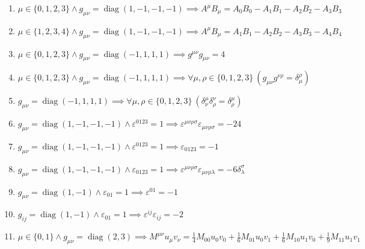 \documentclass[11pt,a4paper]{article}
\begin{document}
\begin{enumerate}
\item $\displaystyle \mu \in \{0, 1, 2, 3\} \land g_{\mu\nu} = \operatorname{diag}(1, -1, -1, -1) \implies A^{\mu} B_{\mu} = A_{0} B_{0} - A_{1} B_{1} - A_{2} B_{2} - A_{3} B_{3}$
\item $\displaystyle \mu \in \{1, 2, 3, 4\} \land g_{\mu\nu} = \operatorname{diag}(1, -1, -1, -1) \implies A^{\mu} B_{\mu} = A_{1} B_{1} - A_{2} B_{2} - A_{3} B_{3} - A_{4} B_{4}$
\item $\displaystyle \mu \in \{0, 1, 2, 3\} \land g_{\mu\nu} = \operatorname{diag}(-1, 1, 1, 1) \implies g^{\mu\nu} g_{\mu\nu} = 4$
\item $\displaystyle \mu \in \{0, 1, 2, 3\} \land g_{\mu\nu} = \operatorname{diag}(-1, 1, 1, 1) \implies \forall \mu, \rho \in \{0, 1, 2, 3\}\ \left( g_{\mu\nu} g^{\nu\rho} = \delta_{\mu}^{\rho} \right)$
\item $\displaystyle g_{\mu\nu} = \operatorname{diag}(-1, 1, 1, 1) \implies \forall \mu, \rho \in \{0, 1, 2, 3\}\ \left( \delta^{\mu}_{\nu}\delta^{\nu}_{\rho} = \delta^{\mu}_{\rho} \right)$
\item $\displaystyle g_{\mu\nu} = \operatorname{diag}(1, -1, -1, -1) \land \varepsilon^{0123} = 1 \implies \varepsilon^{\mu\nu\rho\sigma}\varepsilon_{\mu\nu\rho\sigma} = -24$
\item $\displaystyle g_{\mu\nu} = \operatorname{diag}(1, -1, -1, -1) \land \varepsilon^{0123} = 1 \implies \varepsilon_{0123} = -1$
\item $\displaystyle g_{\mu\nu} = \operatorname{diag}(1, -1, -1, -1) \land \varepsilon_{0123} = 1 \implies \varepsilon^{\mu\nu\rho\sigma}\varepsilon_{\mu\nu\rho\lambda} = -6\delta^{\sigma}_{\lambda}$
\item $\displaystyle g_{\mu\nu} = \operatorname{diag}(1, -1) \land \varepsilon_{01} = 1 \implies \varepsilon^{01} = -1$
\item $\displaystyle g_{ij} = \operatorname{diag}(1, -1) \land \varepsilon_{01} = 1 \implies \varepsilon^{ij}\varepsilon_{ij} = -2$
\item $\displaystyle \mu \in \{0, 1\} \land g_{\mu\nu} = \operatorname{diag}(2, 3) \implies M^{\mu\nu} u_{\mu} v_{\nu} = \frac{1}{4} M_{00} u_{0} v_{0} + \frac{1}{6} M_{01} u_{0} v_{1} + \frac{1}{6} M_{10} u_{1} v_{0} + \frac{1}{9} M_{11} u_{1} v_{1}$
\end{enumerate}
\end{document}
